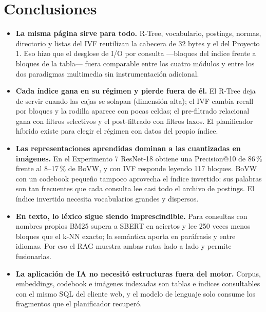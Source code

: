 \section{Conclusiones}

\begin{itemize}
  \item \textbf{La misma página sirve para todo.} R-Tree, vocabulario, postings,
        normas, directorio y listas del IVF reutilizan la cabecera de 32 bytes y el
         del Proyecto 1. Eso hizo que el desglose de I/O por consulta
        ---bloques del índice frente a bloques de la tabla--- fuera comparable entre
        los cuatro módulos y entre los dos paradigmas multimedia sin instrumentación
        adicional.
  \item \textbf{Cada índice gana en su régimen y pierde fuera de él.} El R-Tree deja de
        servir cuando las cajas se solapan (dimensión alta); el IVF cambia recall por
        bloques y la rodilla aparece con pocas celdas; el pre-filtrado relacional gana
        con filtros selectivos y el post-filtrado con filtros laxos. El planificador
        híbrido existe para elegir el régimen con datos del propio índice.
  \item \textbf{Las representaciones aprendidas dominan a las cuantizadas en imágenes.}
        En el Experimento 7 ResNet-18 obtiene una Precision@10 de 86\,\% frente al
        8--17\,\% de BoVW, y con IVF responde leyendo 117 bloques. BoVW con un codebook
        pequeño tampoco aprovecha el índice invertido: sus palabras son tan frecuentes
        que cada consulta lee casi todo el archivo de postings. El índice invertido
        necesita vocabularios grandes y dispersos.
  \item \textbf{En texto, lo léxico sigue siendo imprescindible.} Para consultas con
        nombres propios BM25 supera a SBERT en aciertos y lee 250 veces menos bloques
        que el k-NN exacto; la semántica aporta en paráfrasis y entre idiomas. Por eso
        el RAG muestra ambas rutas lado a lado y permite fusionarlas.
  \item \textbf{La aplicación de IA no necesitó estructuras fuera del motor.} Corpus,
        embeddings, codebook e imágenes indexadas son tablas e índices consultables con
        el mismo SQL del cliente web, y el modelo de lenguaje solo consume los
        fragmentos que el planificador recuperó.
\end{itemize}
